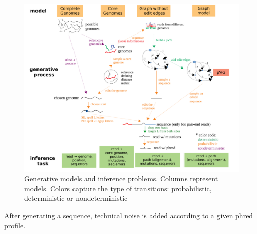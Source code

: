 \begin{figure}
	\includegraphics[width=\linewidth]{figures/models.pdf}
	\caption{Generative models and inference problems. Columns represent models. Colors capture the type of transitions: probabilistic, deterministic or nondeterministic}
	\label{fig:models}
\end{figure}

After generating a sequence, technical noise is added according to a given phred profile.

